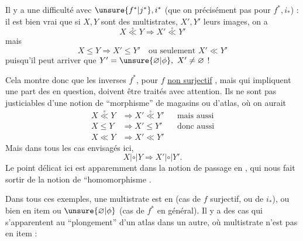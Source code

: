 Il y a une difficulté avec $\unsure{f^*|j^*}, i^*$ (que on  précisément pas pour $f^*, i_*$) : il est bien vrai que si $X,Y$ sont des multistrates, $X',Y'$ leurs images, on a
\[
X\overset{\circ}{\ll}Y\Longrightarrow X'\overset{\circ}{\ll}Y'
\]
mais 
\[
X\leq Y\Longrightarrow X'\leq Y'\quad\text{ou seulement }X'\ll Y'
\]
puisqu'il peut arriver que $Y'=\unsure{\varnothing|\phi},\ X'\ne\varnothing$ !

Cela montre donc que les  inverses $f^*$, pour $f$ \uline{non surjectif} ,   mais qui impliquent une part des  en question, doivent être traités avec  attention. Ils ne sont pas justiciables d'une notion  de ``morphisme'' de magasins ou d'atlas, où on aurait
\[
\begin{aligned}
X\overset{\circ}{\ll}Y&\Longrightarrow X'\overset{\circ}{\ll}Y'&&\text{mais aussi}\\
X\leq Y&\Longrightarrow X'\leq Y'&&\text{donc aussi}\\
X\ll Y&\Longrightarrow X'\ll Y'
\end{aligned}
\]
Mais dans tous les cas envisagés ici, 
\[
X\mathrel{|\circ|}Y\Longrightarrow X'\mathrel{|\circ|}Y'.
\]
Le point délicat ici\unsure{,|;} est apparemment dans la notion de passage en ,  qui nous fait sortir de la notion de ``homomorphisme .

Dans tous ces exemples, une multistrate est  en  (cas de  $f$ surjectif, ou de $i_*$), ou bien en item ou $\unsure{\varnothing|\phi}$ (cas de $f^*$ en général). Il y a des cas qui s'apparentent au ``plongement'' d'un atlas dans un autre, où multistrate n'est  pas  en item :

